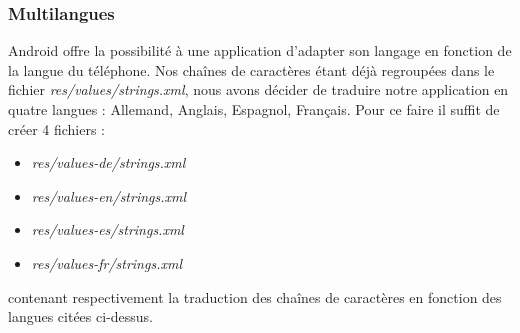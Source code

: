 \subsubsection{Multilangues}
Android offre la possibilité à une application d'adapter son langage en fonction
de la langue du téléphone. Nos chaînes de caractères étant déjà regroupées dans
le fichier \textit{res/values/strings.xml}, nous avons décider de traduire
notre application en quatre langues : Allemand, Anglais, Espagnol, Français.\newline
Pour ce faire il suffit de créer 4 fichiers :
\begin{itemize}
\item \textit{res/values-de/strings.xml}
\item \textit{res/values-en/strings.xml}
\item \textit{res/values-es/strings.xml}
\item \textit{res/values-fr/strings.xml}
\end{itemize}
contenant respectivement la traduction des chaînes de caractères en fonction des
langues citées ci-dessus.
